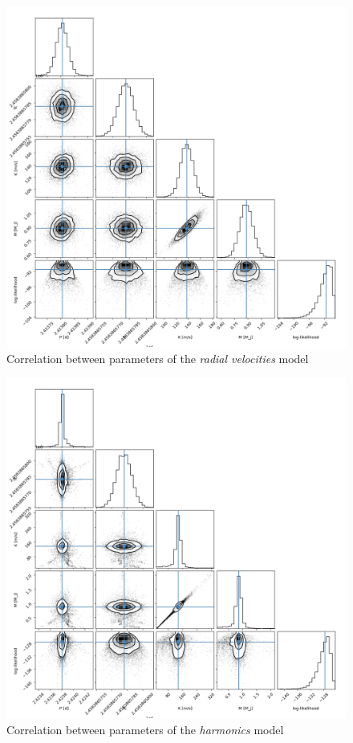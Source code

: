 \documentclass[a4paper,11pt,twocolumn]{article}
\begin{document}
\begin{figure}[h]
    \centering
      \includegraphics[scale=0.3, angle=0]{../pictures/RV/corner_RV.png}
      \caption{Correlation between parameters of the \textit{radial velocities} model}
     \label{fig: cpRV}
\end{figure}

\begin{figure}[h]
    \centering
      \includegraphics[scale=0.3, angle=0]{../pictures/RV/corner_RV_harmonics.png}
      \caption{Correlation between parameters of the \textit{harmonics} model}
     \label{fig: cpRV2}
\end{figure}
\end{document}
